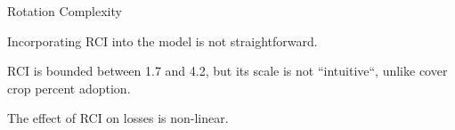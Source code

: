 \documentclass[notes,11pt, aspectratio=169]{beamer}
\newenvironment{wideitemize}{\itemize\addtolength{\itemsep}{10pt}}{\enditemize}
\begin{document}


%    

%    


\begin{frame}{Rotation Complexity}
\begin{wideitemize}
    \item Incorporating RCI into the model is not straightforward.
    \item RCI is bounded between 1.7 and 4.2, but its scale is not ``intuitive``, unlike cover crop percent adoption.
    \item The effect of RCI on losses is non-linear.
\end{wideitemize}
\end{frame}
\end{document}
